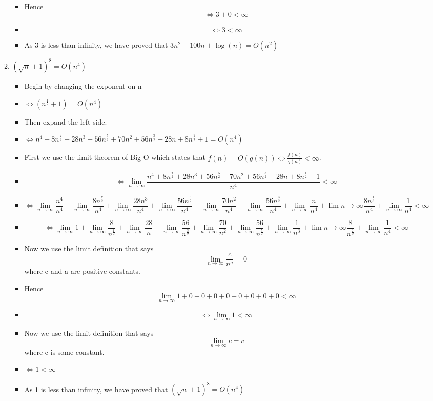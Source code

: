 \begin{enumerate}
\begin{enumerate}
\begin{itemize}
    \item [] Hence {\Large $$\Leftrightarrow 3 + 0 < \infty$$}
    \item [] {\Large $$\Leftrightarrow 3 < \infty$$}
    \item As 3 is less than infinity, we have proved that $3n^{2} + 100n + \log{(n)} = O(n^{2})$
    \end{itemize}
  \item $(\sqrt{n} +1)^{8} = O(n^{4})$
    \begin{itemize}
    \item [] Begin by changing the exponent on n
    \item [] {\Large{$\Leftrightarrow (n^{\frac{1}{2}} +1)=O(n^{4})$}}
    \item [] Then expand the left side.
    \item [] {\Large{$\Leftrightarrow n^{4} + 8n^{\frac{7}{2}} +28n^{3} +56n^{\frac{5}{2}} + 70n^{2} +56n^{\frac{3}{2}} +28n +8n^{\frac{1}{2}} +1 = O(n^{4})$}}
    \item [] First we use the limit theorem of Big O which states that $f(n)=O(g(n)) \Leftrightarrow \frac{f(n)}{g(n)} < \infty$.
    \item [] {\Large{$$\Leftrightarrow \lim_{n \to \infty} \frac{n^{4} + 8n^{\frac{7}{2}} +28n^{3} +56n^{\frac{5}{2}} + 70n^{2} +56n^{\frac{3}{2}} +28n +8n^{\frac{1}{2}} +1}{n^{4}} < \infty$$}}
    \item [] $$\Leftrightarrow \lim_{n \to \infty} \frac{n^{4}}{n^{4}} + \lim_{n \to \infty} \frac{8n^{\frac{7}{2}}}{n^{4}} + \lim_{n \to \infty} \frac{28n^{3}}{n^{4}} + \lim_{n \to \infty} \frac{56n^{\frac{5}{2}}}{n^{4}} + \lim_{n \to \infty} \frac{70n^{2}}{n^{4}} + \lim_{n \to \infty} \frac{56n^{\frac{3}{2}}}{n^{4}} + \lim_{n \to \infty} \frac{n}{n^{4}} + \lim{n \to \infty} \frac{8n^{\frac{1}{8}}}{n^{4}} + \lim_{n \to \infty} \frac{1}{n^{4}} < \infty$$
    \item [] $$\Leftrightarrow \lim_{n \to \infty} 1 + \lim_{n \to \infty} \frac{8}{n^{\frac{1}{2}}} + \lim_{n \to \infty} \frac{28}{n} + \lim_{n \to \infty} \frac{56}{n^{\frac{3}{2}}} + \lim_{n \to \infty} \frac{70}{n^{2}} + \lim_{n \to \infty} \frac{56}{n^{\frac{5}{2}}} + \lim_{n \to \infty} \frac{1}{n^{3}} + \lim{n \to \infty} \frac{8}{n^{\frac{7}{2}}} + \lim_{n \to \infty} \frac{1}{n^{4}} < \infty$$
    \item [] Now we use the limit definition that says {\Large $$\lim_{n \to \infty} \frac{c}{n^{a}} =0$$} where c and a are positive constants.
    \item [] Hence {\Large{$$\lim_{n \to \infty} 1 +0+0+0+0+0+0+0+0 < \infty$$}}
    \item [] {\Large{$$\Leftrightarrow \lim_{n \to \infty} 1 < \infty$$}}
    \item [] Now we use the limit definition that says $$\lim_{n \to \infty} c = c$$ where c is some constant.
    \item [] $\Leftrightarrow 1 < \infty$
    \item As 1 is less than infinity, we have proved that $(\sqrt{n} +1)^{8} =O(n^{4})$
    \end{itemize}
  \end{enumerate}


\end{enumerate}
